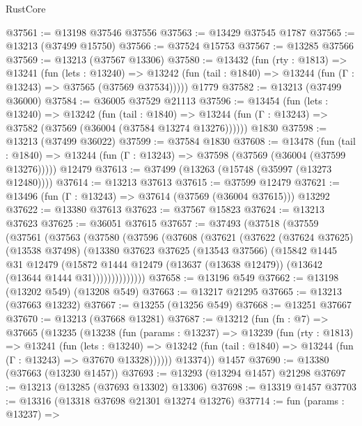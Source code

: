 \begin{lexlean}{RustCore}
\begin{coremodule}
@37561 := @13198 @37546 @37556
@37563 := @13429 @37545 @1787
@37565 := @13213 (@37499 @15750)
@37566 := @37524 @15753
@37567 := @13285 @37566
@37569 := @13213 (@37567 @13306)
@37580 := @13432
    (fun (rty : @1813) =>
    @13241
      (fun (lets : @13240) =>
      @13242 (fun (tail : @1840) => @13244 (fun (Γ : @13243) => @37565 (@37569 @37534)))))
    @1779
@37582 := @13213 (@37499 @36000)
@37584 := @36005 @37529 @21113
@37596 := @13454
    (fun (lets : @13240) =>
    @13242
      (fun (tail : @1840) =>
      @13244 (fun (Γ : @13243) => @37582 (@37569 (@36004 (@37584 @13274 @13276))))))
    @1830
@37598 := @13213 (@37499 @36022)
@37599 := @37584 @1830
@37608 := @13478
    (fun (tail : @1840) => @13244 (fun (Γ : @13243) => @37598 (@37569 (@36004 (@37599 @13276)))))
    @12479
@37613 := @37499 (@13263 (@15748 (@35997 (@13273 @12480))))
@37614 := @13213 @37613
@37615 := @37599 @12479
@37621 := @13496 (fun (Γ : @13243) => @37614 (@37569 (@36004 @37615))) @13292
@37622 := @13380 @37613
@37623 := @37567 @15823
@37624 := @13213 @37623
@37625 := @36051 @37615
@37657 := @37493
    (@37518
      (@37559
        (@37561
          (@37563
            (@37580
              (@37596
                (@37608
                  (@37621
                    (@37622
                      (@37624 @37625)
                      (@13538 @37498)
                      (@13380
                        @37623
                        @37625
                        (@13543 @37566)
                        (@15842
                          @1445
                          @31
                          @12479
                          (@15872
                            @1444
                            @12479
                            (@13637 (@13638 @12479))
                            (@13642 (@13644 @1444 @31))))))))))))))
@37658 := @13196 @549
@37662 := @13198 (@13202 @549) (@13208 @549)
@37663 := @13217 @21295
@37665 := @13213 (@37663 @13232)
@37667 := @13255 (@13256 @549)
@37668 := @13251 @37667
@37670 := @13213 (@37668 @13281)
@37687 := @13212
    (fun (fn : @7) =>
    @37665
      (@13235
        (@13238
          (fun (params : @13237) =>
          @13239
            (fun (rty : @1813) =>
            @13241
              (fun (lets : @13240) =>
              @13242 (fun (tail : @1840) => @13244 (fun (Γ : @13243) => @37670 @13328))))))
        @13374))
    @1457
@37690 := @13380 (@37663 (@13230 @1457))
@37693 := @13293 (@13294 @1457) @21298
@37697 := @13213 (@13285 (@37693 @13302) @13306)
@37698 := @13319 @1457
@37703 := @13316 (@13318 @37698 @21301 @13274 @13276)
@37714 := fun (params : @13237) =>

\end{coremodule}
\end{lexlean}
